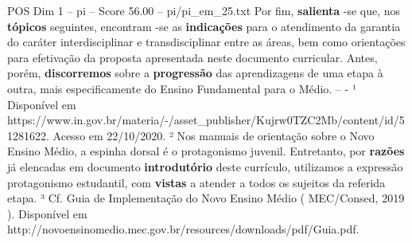 \begin{textsample}{POS Dim 1 – pi – Score 56.00 – pi/pi\_em\_25.txt}
Por fim, \textbf{salienta} -se que, nos \textbf{tópicos} seguintes, encontram -se as \textbf{indicações} para o atendimento da garantia do caráter interdisciplinar e transdisciplinar entre as áreas, bem como orientações para efetivação da proposta apresentada neste documento curricular.
Antes, porém, \textbf{discorremos} sobre a \textbf{progressão} das aprendizagens de uma etapa à outra, mais especificamente do Ensino Fundamental para o Médio. -- - ¹ Disponível em https://www.in.gov.br/materia/-/asset\_publisher/Kujrw0TZC2Mb/content/id/51281622.
Acesso em 22/10/2020. ² Nos manuais de orientação sobre o Novo Ensino Médio, a espinha dorsal é o protagonismo juvenil.
Entretanto, por \textbf{razões} já elencadas em documento \textbf{introdutório} deste currículo, utilizamos a expressão protagonismo estudantil, com \textbf{vistas} a atender a todos os sujeitos da referida etapa. ³ Cf.
Guia de Implementação do Novo Ensino Médio ( MEC/Consed, 2019 ).
Disponível em http://novoensinomedio.mec.gov.br/resources/downloads/pdf/Guia.pdf.

\end{textsample}
